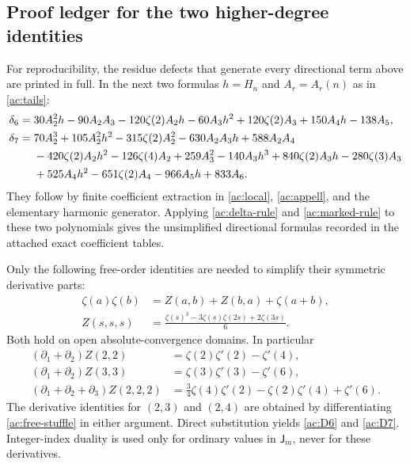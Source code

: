 \subsection{Proof ledger for the two higher-degree identities}

For reproducibility, the residue defects that generate every
directional term above are printed in full. In the next two formulas
$h=H_n$ and $A_r=A_r(n)$ as in \eqref{ac:tails}:
\begin{align}\label{ac:delta6}
 \delta_6={}&30A_2^2h-90A_2A_3-120\zeta(2)A_2h
       -60A_3h^2+120\zeta(2)A_3+150A_4h-138A_5,\\
 \delta_7={}&70A_2^3+105A_2^2h^2-315\zeta(2)A_2^2
       -630A_2A_3h+588A_2A_4\notag\\
 &-420\zeta(2)A_2h^2-126\zeta(4)A_2+259A_3^2
       -140A_3h^3+840\zeta(2)A_3h-280\zeta(3)A_3\notag\\
 &+525A_4h^2-651\zeta(2)A_4-966A_5h+833A_6.
       \label{ac:delta7}
\end{align}
They follow by finite coefficient extraction in \eqref{ac:local},
\eqref{ac:appell}, and the elementary harmonic generator. Applying
\eqref{ac:delta-rule} and \eqref{ac:marked-rule} to these two
polynomials gives the unsimplified directional formulas recorded
in the attached exact coefficient tables.

Only the following free-order identities are needed to simplify
their symmetric derivative parts:
\begin{align}
 \zeta(a)\zeta(b)&=Z(a,b)+Z(b,a)+\zeta(a+b),\label{ac:free-stuffle}\\
 Z(s,s,s)&=\frac{\zeta(s)^3-3\zeta(s)\zeta(2s)+2\zeta(3s)}6.
       \label{ac:equal-triple}
\end{align}
Both hold on open absolute-convergence domains. In particular
\begin{align*}
 (\partial_1+\partial_2)Z(2,2)
       &=\zeta(2)\zeta'(2)-\zeta'(4),\\
 (\partial_1+\partial_2)Z(3,3)
       &=\zeta(3)\zeta'(3)-\zeta'(6),\\
 (\partial_1+\partial_2+\partial_3)Z(2,2,2)
       &=\frac34\zeta(4)\zeta'(2)-\zeta(2)\zeta'(4)+\zeta'(6).
\end{align*}
The derivative identities for $(2,3)$ and $(2,4)$ are obtained by
differentiating \eqref{ac:free-stuffle} in either argument. Direct
substitution yields \eqref{ac:D6} and \eqref{ac:D7}. Integer-index
duality is used only for ordinary values in $\mathsf J_m$, never
for these derivatives.

